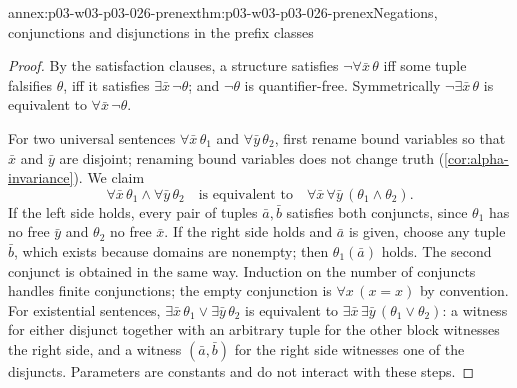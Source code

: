 \begin{annexitem}{annex:p03-w03-p03-026-prenex}{thm:p03-w03-p03-026-prenex}{Negations, conjunctions and disjunctions in the prefix classes}
\begin{proof}
By the satisfaction clauses, a structure satisfies
\(\neg\forall\bar x\,\theta\) iff some tuple falsifies \(\theta\), iff it
satisfies \(\exists\bar x\,\neg\theta\); and \(\neg\theta\) is
quantifier-free.  Symmetrically \(\neg\exists\bar x\,\theta\) is equivalent
to \(\forall\bar x\,\neg\theta\).

For two universal sentences \(\forall\bar x\,\theta_1\) and
\(\forall\bar y\,\theta_2\), first rename bound variables so that
\(\bar x\) and \(\bar y\) are disjoint; renaming bound variables does not
change truth (\cref{cor:alpha-invariance}).  We claim
\[
 \forall\bar x\,\theta_1\land\forall\bar y\,\theta_2
 \quad\text{is equivalent to}\quad
 \forall\bar x\,\forall\bar y\,(\theta_1\land\theta_2).
\]
If the left side holds, every pair of tuples \(\bar a,\bar b\) satisfies
both conjuncts, since \(\theta_1\) has no free \(\bar y\) and \(\theta_2\)
no free \(\bar x\).  If the right side holds and \(\bar a\) is given, choose
any tuple \(\bar b\), which exists because domains are nonempty; then
\(\theta_1(\bar a)\) holds.  The second conjunct is obtained in the same
way.  Induction on the number of conjuncts handles finite conjunctions; the
empty conjunction is \(\forall x\,(x=x)\) by convention.  For existential
sentences,
\(\exists\bar x\,\theta_1\lor\exists\bar y\,\theta_2\) is equivalent to
\(\exists\bar x\,\exists\bar y\,(\theta_1\lor\theta_2)\): a witness for
either disjunct together with an arbitrary tuple for the other block
witnesses the right side, and a witness \((\bar a,\bar b)\) for the right
side witnesses one of the disjuncts.  Parameters are constants and do not
interact with these steps.
\end{proof}
\end{annexitem}


